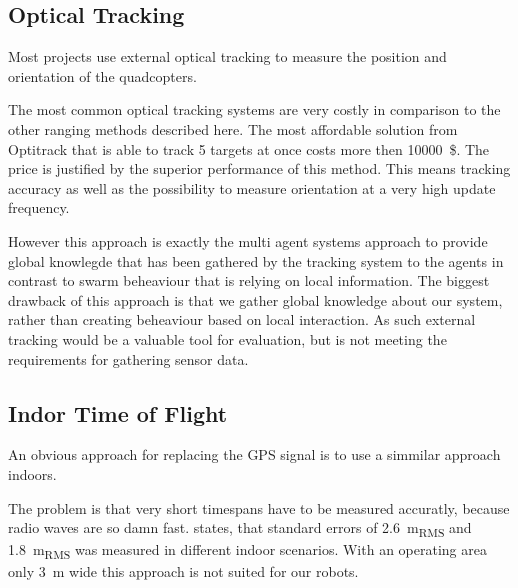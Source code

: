 \subsection{Optical Tracking}

Most projects use external optical tracking to measure the position and orientation of the quadcopters. 

The most common optical tracking systems are very costly in comparison to the other ranging methods described here.
The most affordable solution from Optitrack that is able to track 5 targets at once costs more then \SI{10000}{\$}\cite{optitrack.com}.
The price is justified by the superior performance of this method.
This means tracking accuracy as well as the possibility to measure orientation at a very high update frequency.


However this approach is exactly the multi agent systems approach to provide global knowlegde that has been gathered by the tracking system to the agents in contrast to swarm beheaviour that is relying on local information.
The biggest drawback of this approach is that we gather global knowledge about our system, rather than creating beheaviour based on local interaction.
As such external tracking would be a valuable tool for evaluation, but is not meeting the requirements for gathering sensor data.


\subsection{Indor Time of Flight}
An obvious approach for replacing the GPS signal is to use a simmilar approach indoors.

The problem is that very short timespans have to be measured accuratly, because radio waves are so damn fast. 
\cite{lanzisera2006} states, that standard errors of \SI{2.6}{\metre_{RMS}} and \SI{1.8}{\metre_{RMS}} was measured in different indoor scenarios.
With an operating area only \SI{3}{\metre} wide this approach is not suited for our robots.



